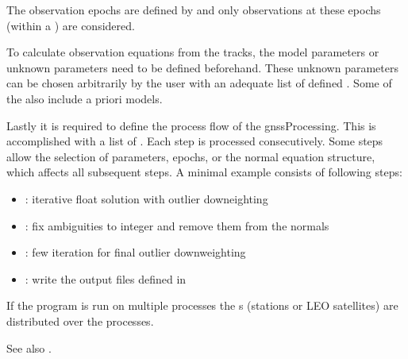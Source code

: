 The observation epochs are defined by 
and only observations at these epochs (within a ) are considered.

To calculate observation equations from the tracks, the model parameters or unknown parameters need to be
defined beforehand. These unknown parameters can be chosen arbitrarily by the user with an adequate list of defined
.
Some of the  also include a priori models.

Lastly it is required to define the process flow of the gnssProcessing. This is accomplished
with a list of .
Each step is processed consecutively. Some steps allow the selection of parameters, epochs,
or the normal equation structure, which affects all subsequent steps.
A minimal example consists of following steps:
\begin{itemize}
  \item {}: iterative float solution with outlier downeighting
  \item {}:
        fix ambiguities to integer and remove them from the normals
  \item {}: few iteration for final outlier downweighting
  \item {}:
        write the output files defined in 
\end{itemize}

If the program is run on multiple processes the s
(stations or LEO satellites) are distributed over the processes.

See also .


